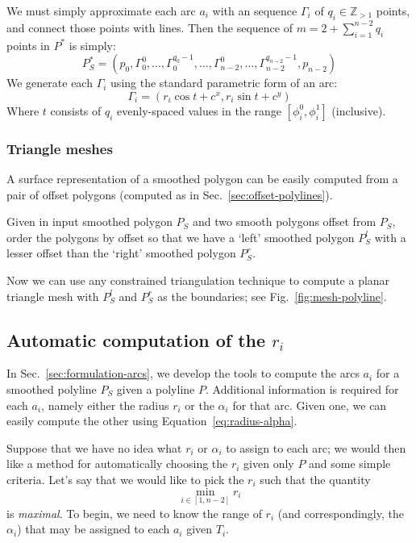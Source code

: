 \documentclass{article}
\begin{document}
%
We must simply approximate each arc $a_i$ with an sequence $\Gamma_i$ of $q_i \in \mathbb{Z}_{>1}$ points, and connect those points with lines.  Then the sequence of $m = 2 + \sum^{n-2}_{i=1} q_i$ points in $P^*$ is simply:
%
\begin{equation}
  \label{eq:p-star}
  P^*_S = \left(p_0, \Gamma^0_0, \ldots, \Gamma^{q_0-1}_0, \ldots, \Gamma^{0}_{n-2}, \ldots, \Gamma^{q_{n-2}-1}_{n-2},  p_{n-2}\right)
\end{equation}
%
We generate each $\Gamma_i$ using the standard parametric form of an arc:
%
\begin{equation}
  \label{eq:arc-segments}
  \Gamma_i = \left(r_i \cos t + c^x, r_i \sin t + c^y\right)
\end{equation}
%
Where $t$ consists of $q_i$ evenly-spaced values in the range $\left[\phi^0_i, \phi^1_i\right]$ (inclusive).
%
\subsubsection{Triangle meshes}
%
A surface representation of a smoothed polygon can be easily computed from a pair of offset polygons (computed as in Sec.~\ref{sec:offset-polylines}).

Given in input smoothed polygon $P_S$ and two smooth polygons offset from $P_S$, order the polygons by offset so that we have a `left' smoothed polygon $P^l_S$ with a lesser offset than the `right' smoothed polygon $P^r_S$.

Now we can use any constrained triangulation technique to compute a planar triangle mesh with $P^l_S$ and $P^r_S$ as the boundaries; see Fig.~\ref{fig:mesh-polyline}.
%
\subsection{Automatic computation of the $r_i$}
%
In Sec.~\ref{sec:formulation-arcs}, we develop the tools to compute the arcs $a_{i}$ for a smoothed polyline $P_{S}$ given a polyline $P$.  Additional information is required for each $a_{i}$, namely either the radius $r_{i}$ or the $\alpha_i$ for that arc.  Given one, we can easily compute the other using Equation~\eqref{eq:radius-alpha}.

Suppose that we have no idea what $r_{i}$ or $\alpha_{i}$ to assign to each arc; we would then like a method for automatically choosing the $r_{i}$ given only $P$ and some simple criteria.  Let's say that we would like to pick the $r_{i}$ such that the quantity
%
\begin{equation}
  \label{eq:optimize-radius}
  \min_{i \in [1, n-2]} r_{i}
\end{equation}
%
is \emph{maximal}.  To begin, we need to know the range of $r_{i}$ (and correspondingly, the $\alpha_{i}$) that may be assigned to each $a_{i}$ given $T_{i}$.
%
\end{document}
